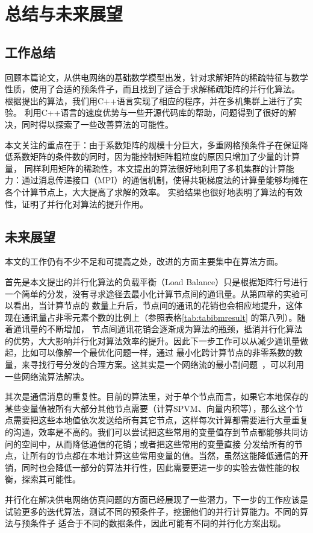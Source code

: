 \chapter{总结与未来展望}
\label{cha:conclusion}

\section{工作总结}

回顾本篇论文，从供电网络的基础数学模型出发，针对求解矩阵的稀疏特征与数学性质，使用了合适的预条件子，而且找到了适合于求解稀疏矩阵的并行化算法。
根据提出的算法，我们用C++语言实现了相应的程序，并在多机集群上进行了实验。
利用C++语言的速度优势与一些开源代码库的帮助，问题得到了很好的解决，同时得以探索了一些改善算法的可能性。

本文关注的重点在于：由于系数矩阵的规模十分巨大，多重网格预条件子在保证降低系数矩阵的条件数的同时，因为能控制矩阵粗粒度的原因只增加了少量的计算量，
同样利用矩阵的稀疏性，本文提出的算法很好地利用了多机集群的计算能力：通过消息传递接口（MPI）的通信机制，使得共轭梯度法的计算量能够均摊在各个计算节点上，大大提高了求解的效率。
实验结果也很好地表明了算法的有效性，证明了并行化对算法的提升作用。

\section{未来展望}

本文的工作仍有不少不足和可提高之处，改进的方面主要集中在算法方面。

首先是本文提出的并行化算法的负载平衡（Load Balance）只是根据矩阵行号进行一个简单的分发，没有寻求途径去最小化计算节点间的通讯量。从第四章的实验可以看出，当计算节点的
数量上升后，节点间的通讯的花销也会相应地提升，这体现在通讯量占非零元素个数的比例上（参照表格\ref{tab:tabibmresult} 的第八列）。随着通讯量的不断增加，
节点间通讯花销会逐渐成为算法的瓶颈，抵消并行化算法的优势，大大影响并行化对算法效率的提升。因此下一步工作可以从减少通讯量做起，比如可以像解一个最优化问题一样，通过
最小化跨计算节点的非零系数的数量，来寻找行号分发的合理方案。这其实是一个网络流的最小割问题~\cite{lawler20014, boykov2004experimental}，可以利用一些网络流算法解决。

其次是通信消息的重复性。目前的算法里，对于单个节点而言，如果它本地保存的某些变量值被所有大部分其他节点需要（计算SPVM、向量内积等），那么这个节点需要把这些本地值依次发送给所有其它节点，这样每次计算都需要进行大量重复的沟通，效率是不高的。我们可以尝试把这些常用的变量值存到节点都能够共同访问的空间中，从而降低通信的花销；或者把这些常用的变量直接
分发给所有的节点，让所有的节点都在本地计算这些常用变量的值。当然，虽然这能降低通信的开销，同时也会降低一部分的算法并行性，因此需要更进一步的实验去做性能的权衡，探索其可能性。

并行化在解决供电网络仿真问题的方面已经展现了一些潜力，下一步的工作应该是试验更多的迭代算法，测试不同的预条件子，挖掘他们的并行计算能力。不同的算法与预条件子
适合于不同的数据条件，因此可能有不同的并行化方案出现。
